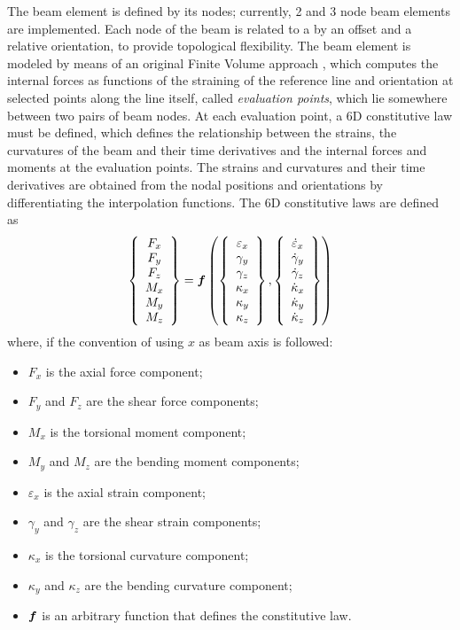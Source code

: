 \noindent
The beam element is defined by its nodes; currently, 2 and 3 node 
beam elements are implemented.
Each node of the beam is related to a  by an offset
and a relative orientation, to provide topological flexibility.
The beam element is modeled by means of an original Finite Volume approach
\cite{FV-AIAA}, which computes the internal forces as functions 
of the straining of the reference line and orientation at selected points
along the line itself, called \emph{evaluation points},
which lie somewhere between two pairs of beam nodes.
At each evaluation point, a 6D constitutive law must be defined,
which defines the relationship between the strains, the curvatures
of the beam and their time derivatives
and the internal forces and moments at the evaluation points.
The strains and curvatures and their time derivatives are obtained 
from the nodal positions and orientations by differentiating
the interpolation functions.
The 6D constitutive laws are defined as
\begin{displaymath}
	\left\{ \begin{array}{c} 
		F_x \\
		F_y \\
		F_z \\
		M_x \\
		M_y \\
		M_z
	 \end{array} \right\} = \boldsymbol{f}\left( 
		\left\{ \begin{array}{c} 
			\varepsilon_x \\
			\gamma_y \\
			\gamma_z \\
			\kappa_x \\
			\kappa_y \\
			\kappa_z
		 \end{array} \right\},
		\left\{ \begin{array}{c} 
			\dot{\varepsilon}_x \\
			\dot{\gamma}_y \\
			\dot{\gamma}_z \\
			\dot{\kappa}_x \\
			\dot{\kappa}_y \\
			\dot{\kappa}_z
		 \end{array} \right\}
	 \right)
\end{displaymath}
where, if the convention of using $x$ as beam axis is followed:
\begin{itemize}
\item $F_x$ is the axial force component;
\item $F_y$ and $F_z$ are the shear force components;
\item $M_x$ is the torsional moment component;
\item $M_y$ and $M_z$ are the bending moment components;
\item $\varepsilon_x$ is the axial strain component;
\item $\gamma_y$ and $\gamma_z$ are the shear strain components;
\item $\kappa_x$ is the torsional curvature component;
\item $\kappa_y$ and $\kappa_z$ are the bending curvature component;
\item $\boldsymbol{f}$ is an arbitrary function that defines the constitutive law.
\end{itemize}



